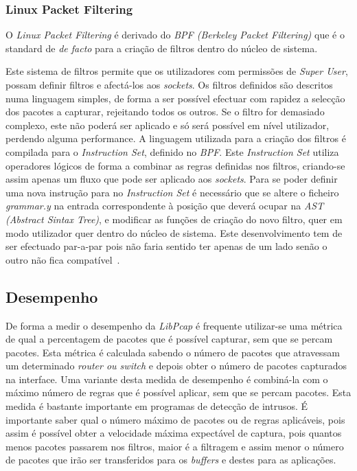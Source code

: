 \subsubsection{Linux Packet Filtering}
O \textit{Linux Packet Filtering} é derivado do \textit{BPF (Berkeley Packet Filtering)} que é o standard de \textit{de facto} para a criação de filtros dentro do núcleo de sistema. 

Este sistema de filtros permite que os utilizadores com permissões de \textit{Super User}, possam definir filtros e afectá-los aos \textit{sockets}. Os filtros definidos são descritos numa linguagem simples, de forma a ser possível efectuar com rapidez a selecção dos pacotes a capturar, rejeitando todos os outros. Se o filtro for demasiado complexo, este não poderá ser aplicado e só será possível em nível utilizador, perdendo alguma performance. A linguagem utilizada para a criação dos filtros é compilada para o \textit{Instruction Set}, definido no \textit{BPF}. Este \textit{Instruction Set} utiliza operadores lógicos de forma a combinar as regras definidas nos filtros, criando-se assim apenas um fluxo que pode ser aplicado aos \textit{sockets}.
Para se poder definir uma nova instrução para no \textit{Instruction Set} é necessário que se altere o ficheiro \textit{grammar.y} na entrada correspondente à posição que deverá ocupar na \textit{AST (Abstract Sintax Tree)}, e modificar as funções de criação do novo filtro, quer em modo utilizador quer dentro do núcleo de sistema. Este desenvolvimento tem de ser efectuado par-a-par pois não faria sentido ter apenas de um lado senão o outro não fica compatível~\cite{Mccanne92thebsd}.

\subsection{Desempenho}
De forma a medir o desempenho da \textit{LibPcap} é frequente utilizar-se uma métrica de qual a percentagem de pacotes que é possível capturar, sem que se percam pacotes. Esta métrica é calculada sabendo o número de pacotes que atravessam um determinado \textit{router ou switch} e depois obter o número de pacotes capturados na interface. Uma variante desta medida de desempenho é combiná-la com o máximo número de regras que é possível aplicar, sem que se percam pacotes. Esta medida é bastante importante em programas de detecção de intrusos. É importante saber qual o número máximo de pacotes ou de regras aplicáveis, pois assim é possível obter a velocidade máxima expectável de captura, pois quantos menos pacotes passarem nos filtros, maior é a filtragem e assim menor o número de pacotes que irão ser transferidos para os \textit{buffers} e destes para as aplicações.

